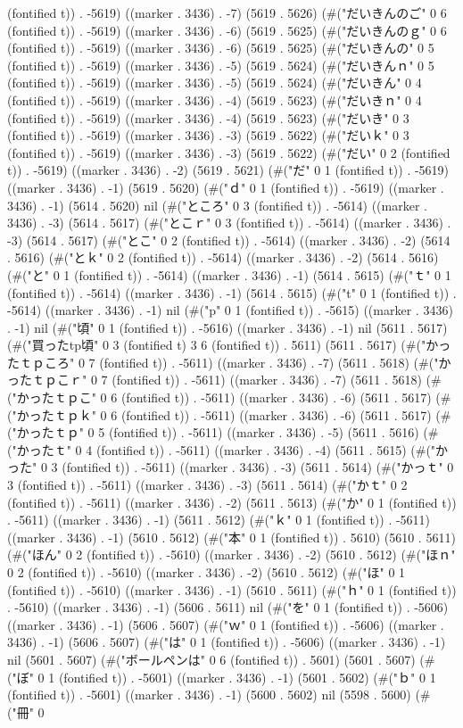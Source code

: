 (fontified t)) . -5619) ((marker . 3436) . -7) (5619 . 5626) (#("だいきんのご" 0 6 (fontified t)) . -5619) ((marker . 3436) . -6) (5619 . 5625) (#("だいきんのｇ" 0 6 (fontified t)) . -5619) ((marker . 3436) . -6) (5619 . 5625) (#("だいきんの" 0 5 (fontified t)) . -5619) ((marker . 3436) . -5) (5619 . 5624) (#("だいきんｎ" 0 5 (fontified t)) . -5619) ((marker . 3436) . -5) (5619 . 5624) (#("だいきん" 0 4 (fontified t)) . -5619) ((marker . 3436) . -4) (5619 . 5623) (#("だいきｎ" 0 4 (fontified t)) . -5619) ((marker . 3436) . -4) (5619 . 5623) (#("だいき" 0 3 (fontified t)) . -5619) ((marker . 3436) . -3) (5619 . 5622) (#("だいｋ" 0 3 (fontified t)) . -5619) ((marker . 3436) . -3) (5619 . 5622) (#("だい" 0 2 (fontified t)) . -5619) ((marker . 3436) . -2) (5619 . 5621) (#("だ" 0 1 (fontified t)) . -5619) ((marker . 3436) . -1) (5619 . 5620) (#("ｄ" 0 1 (fontified t)) . -5619) ((marker . 3436) . -1) (5614 . 5620) nil (#("ところ" 0 3 (fontified t)) . -5614) ((marker . 3436) . -3) (5614 . 5617) (#("とこｒ" 0 3 (fontified t)) . -5614) ((marker . 3436) . -3) (5614 . 5617) (#("とこ" 0 2 (fontified t)) . -5614) ((marker . 3436) . -2) (5614 . 5616) (#("とｋ" 0 2 (fontified t)) . -5614) ((marker . 3436) . -2) (5614 . 5616) (#("と" 0 1 (fontified t)) . -5614) ((marker . 3436) . -1) (5614 . 5615) (#("ｔ" 0 1 (fontified t)) . -5614) ((marker . 3436) . -1) (5614 . 5615) (#("t" 0 1 (fontified t)) . -5614) ((marker . 3436) . -1) nil (#("p" 0 1 (fontified t)) . -5615) ((marker . 3436) . -1) nil (#("頃" 0 1 (fontified t)) . -5616) ((marker . 3436) . -1) nil (5611 . 5617) (#("買ったtp頃" 0 3 (fontified t) 3 6 (fontified t)) . 5611) (5611 . 5617) (#("かったｔｐころ" 0 7 (fontified t)) . -5611) ((marker . 3436) . -7) (5611 . 5618) (#("かったｔｐこｒ" 0 7 (fontified t)) . -5611) ((marker . 3436) . -7) (5611 . 5618) (#("かったｔｐこ" 0 6 (fontified t)) . -5611) ((marker . 3436) . -6) (5611 . 5617) (#("かったｔｐｋ" 0 6 (fontified t)) . -5611) ((marker . 3436) . -6) (5611 . 5617) (#("かったｔｐ" 0 5 (fontified t)) . -5611) ((marker . 3436) . -5) (5611 . 5616) (#("かったｔ" 0 4 (fontified t)) . -5611) ((marker . 3436) . -4) (5611 . 5615) (#("かった" 0 3 (fontified t)) . -5611) ((marker . 3436) . -3) (5611 . 5614) (#("かっｔ" 0 3 (fontified t)) . -5611) ((marker . 3436) . -3) (5611 . 5614) (#("かｔ" 0 2 (fontified t)) . -5611) ((marker . 3436) . -2) (5611 . 5613) (#("か" 0 1 (fontified t)) . -5611) ((marker . 3436) . -1) (5611 . 5612) (#("ｋ" 0 1 (fontified t)) . -5611) ((marker . 3436) . -1) (5610 . 5612) (#("本" 0 1 (fontified t)) . 5610) (5610 . 5611) (#("ほん" 0 2 (fontified t)) . -5610) ((marker . 3436) . -2) (5610 . 5612) (#("ほｎ" 0 2 (fontified t)) . -5610) ((marker . 3436) . -2) (5610 . 5612) (#("ほ" 0 1 (fontified t)) . -5610) ((marker . 3436) . -1) (5610 . 5611) (#("ｈ" 0 1 (fontified t)) . -5610) ((marker . 3436) . -1) (5606 . 5611) nil (#("を" 0 1 (fontified t)) . -5606) ((marker . 3436) . -1) (5606 . 5607) (#("ｗ" 0 1 (fontified t)) . -5606) ((marker . 3436) . -1) (5606 . 5607) (#("は" 0 1 (fontified t)) . -5606) ((marker . 3436) . -1) nil (5601 . 5607) (#("ボールペンは" 0 6 (fontified t)) . 5601) (5601 . 5607) (#("ぼ" 0 1 (fontified t)) . -5601) ((marker . 3436) . -1) (5601 . 5602) (#("ｂ" 0 1 (fontified t)) . -5601) ((marker . 3436) . -1) (5600 . 5602) nil (5598 . 5600) (#("冊" 0 